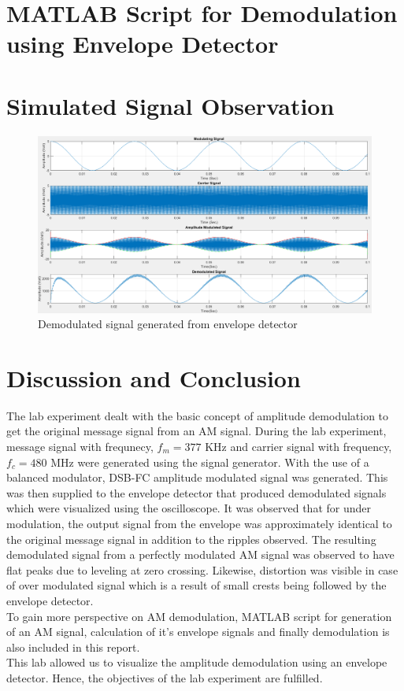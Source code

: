 \documentclass{lab_sheet}
\begin{document}
    \section{MATLAB Script for Demodulation using Envelope Detector}
    \section{Simulated Signal Observation}
    \begin{figure}[H]
        \centering
        \includegraphics[width=\linewidth]{Figures/sim_demod.png}
        \caption{Demodulated signal generated from envelope detector}
        \label{fig:simdemod}
    \end{figure}
    \section{Discussion and Conclusion}
    The lab experiment dealt with the basic concept of amplitude demodulation to get the original message signal from an AM signal. During the lab experiment, message signal with frequnecy, $f_m=377$ KHz and carrier signal with frequency, $f_c=480$ MHz were generated using the signal generator. With the use of a balanced modulator, DSB-FC amplitude modulated signal was generated. This was then supplied to the envelope detector that produced demodulated signals which were visualized using the oscilloscope.
    It was observed that for under modulation, the output signal from the envelope was approximately identical to the original message signal in addition to the ripples observed. The resulting demodulated signal from a perfectly modulated AM signal was observed to have flat peaks due to leveling at zero crossing. Likewise, distortion was visible in case of over modulated signal which is a result of small crests being followed by the envelope detector.\\To gain more perspective on AM demodulation, MATLAB script for generation of an AM signal, calculation of it's envelope signals and finally demodulation is also included in this report.\\
    This lab allowed us to visualize the amplitude demodulation using an envelope detector. Hence, the objectives of the lab experiment are fulfilled. 
\end{document}
